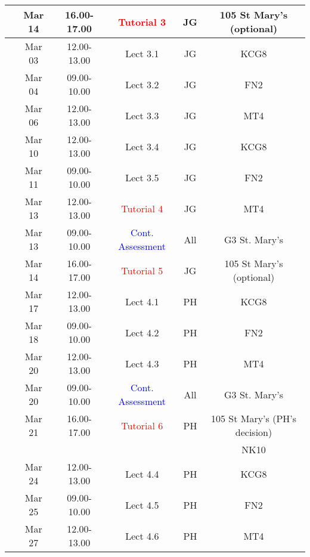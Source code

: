 \documentclass[11pt,oneside,a4paper]{article}
\begin{document}
\begin{center}
\begin{tabular}{||c||c|c|c|c|c||}
                                      & Mar 14   & 16.00-17.00 & \textcolor{red}{Tutorial 3} & JG  & 105 St Mary's (optional)\\
\hline
\multirow{3}{*}{\color{red}{Week 34}} & Mar 03   & 12.00-13.00 & Lect  3.1  & JG  & KCG8 \\
                                      & Mar 04   & 09.00-10.00 & Lect  3.2  & JG  & FN2  \\
                                      & Mar 06   & 12.00-13.00 & Lect  3.3  & JG  & MT4  \\
\hline
\multirow{3}{*}{\color{red}{Week 35}} & Mar 10   & 12.00-13.00 & Lect  3.4  & JG  & KCG8 \\
                                      & Mar 11   & 09.00-10.00 & Lect  3.5  & JG  & FN2  \\
                                      & Mar 13   & 12.00-13.00 & \textcolor{red}{Tutorial 4} & JG  & MT4  \\
                                      & Mar 13   & 09.00-10.00 & \textcolor{blue}{Cont. Assessment}& All  &  G3 St. Mary's \\
                                      & Mar 14   & 16.00-17.00 & \textcolor{red}{Tutorial 5} & JG  & 105 St Mary's (optional)\\
\hline
\multirow{3}{*}{\color{red}{Week 36}} & Mar 17   & 12.00-13.00 & Lect  4.1  & PH  & KCG8 \\
                                      & Mar 18   & 09.00-10.00 & Lect  4.2  & PH  & FN2  \\
                                      & Mar 20   & 12.00-13.00 & Lect  4.3  & PH  & MT4  \\
                                      & Mar 20   & 09.00-10.00 & \textcolor{blue}{Cont. Assessment}& All  &  G3 St. Mary's \\
                                      & Mar 21   & 16.00-17.00 & \textcolor{red}{Tutorial 6} & PH  & 105 St Mary's (PH's decision)\\
                                      &          &             &             &     & NK10 \\
\hline
\multirow{3}{*}{\color{red}{Week 37}} & Mar 24   & 12.00-13.00 & Lect  4.4  & PH  & KCG8 \\
                                      & Mar 25   & 09.00-10.00 & Lect  4.5  & PH  & FN2  \\
                                      & Mar 27   & 12.00-13.00 & Lect  4.6  & PH  & MT4  \\

\end{tabular}
\end{center}
\end{document}
